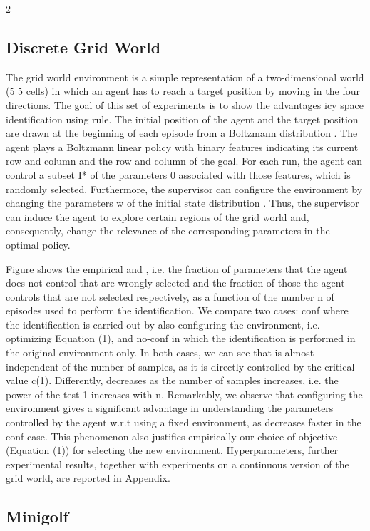 \documentclass{article}
\begin{document}
\begin{paracol}{2}
\subsection*{Discrete Grid World}


The grid world environment is a simple representation of a
two-dimensional world (5  5 cells) in which an agent has to
reach a target position by moving in the four directions. The
goal of this set of experiments is to show the advantages
icy space identification using rule. The initial position of the
agent and the target position are drawn at the beginning of
each episode from a Boltzmann distribution . The agent
plays a Boltzmann linear policy  with binary features  indicating its current row and column and the row and column
of the goal. For each run, the agent can control a subset I*
of the parameters 0 associated with those features, which
is randomly selected. Furthermore, the supervisor can configure the environment by changing the parameters w of the
initial state distribution . Thus, the supervisor can induce
the agent to explore certain regions of the grid world and,
consequently, change the relevance of the corresponding parameters in the optimal policy.

\switchcolumn
\RaggedRight

Figure shows the empirical  and , i.e. the fraction of
parameters that the agent does not control that are wrongly
selected and the fraction of those the agent controls that are
not selected respectively, as a function of the number n of
episodes used to perform the identification. We compare two
cases: conf where the identification is carried out by also
configuring the environment, i.e. optimizing Equation (1),
and no-conf in which the identification is performed in the
original environment only. In both cases, we can see that
 is almost independent of the number of samples, as it is
directly controlled by the critical value c(1). Differently, 
decreases as the number of samples increases, i.e. the power
of the test 1   increases with n. Remarkably, we observe
that configuring the environment gives a significant advantage in understanding the parameters controlled by the agent
w.r.t using a fixed environment, as  decreases faster in the
conf case. This phenomenon also justifies empirically our
choice of objective (Equation (1)) for selecting the new environment. Hyperparameters, further experimental results, together with experiments on a continuous version of the grid
world, are reported in Appendix.


\subsection*{Minigolf}



\end{paracol}
\end{document}
